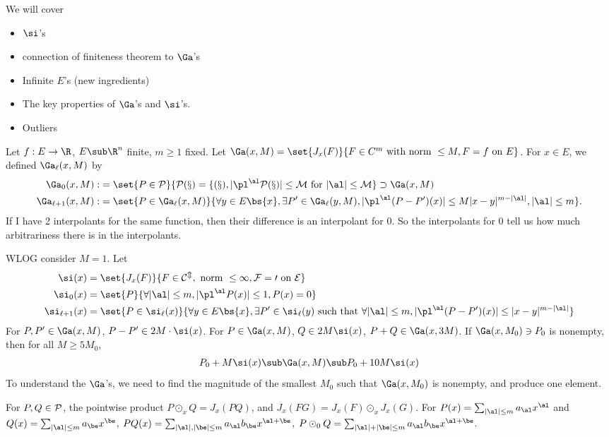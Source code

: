 
We will cover
\begin{itemize}
\item
$\si$'s
\item
connection of finiteness theorem to $\Ga$'s
\item
Infinite $E$'s (new ingredients)
\item
The key properties of $\Ga$'s and $\si$'s.
\item 
Outliers
\end{itemize}

Let $f:E\to \R$, $E\sub \R^n$ finite, $m\ge 1$ fixed. Let $\Ga(x,M) = \set{J_x(F)}{F\in C^m \text{ with norm }\le M, F=f\text{ on }E}$. For $x\in E$, we defined $\Ga_\ell (x,M)$ by 
\begin{align}
\Ga_0(x,M) :&= \set{P\in \cal P}{P(x)=f(x), |\pl^\al P(x)|\le M\text{ for }|\al|\le M}\supset \Ga(x,M)\\
\Ga_{\ell+1}(x,M) :&= 
\set{P\in \Ga_\ell(x,M)}{\forall y\in E\bs \{x\}, \exists P'\in \Ga_\ell(y,M), |\pl^\al(P-P')(x)|\le M|x-y|^{m-|\al|}, |\al|\le m}.
\end{align}
If I have 2 interpolants for the same function, then their difference is an interpolant for 0. So the interpolants for 0 tell us how much arbitrariness there is in the interpolants. 

WLOG consider $M=1$.
Let 
\begin{align}
\si(x) &= \set{J_x(F)}{F\in \cal C^m, \text{ norm }\le 1, F=0\text{ on }E}\\
\si_0(x) &=\set{P}{\forall |\al|\le m,|\pl^\al P(x)|\le 1, P(x)=0}\\
\si_{\ell+1}(x)&=\set{P\in \si_\ell(x)}{\forall y\in E\bs \{x\}, \exists P'\in \si_\ell(y)\text{ such that }\forall |\al|\le m, |\pl^\al(P-P')(x)|\le |x-y|^{m-|\al|}}
\end{align}
For $P,P'\in \Ga(x,M)$, $P-P'\in 2M \cdot \si(x)$. For $P\in \Ga(x,M)$, $Q\in 2M\si(x)$, $P+Q\in \Ga(x,3M)$. 
If $\Ga(x,M_0)\ni P_0$ is nonempty, then for all $M\ge 5M_0$, 
\begin{align}
P_0+M\si(x) \sub \Ga(x,M) \sub P_0+10M\si(x)
\end{align}
To understand the $\Ga$'s,  we need to find the magnitude of the smallest $M_0$ such that $\Ga(x,M_0)$ is nonempty, and produce one element. 

For $P,Q\in \cal P$, the pointwise product $P\odot_x Q= J_x(PQ)$, and $J_x(FG) = J_x(F)\odot_x J_x(G)$. For $P(x) = \sum_{|\al|\le m} a_\al x^\al$ and $Q(x) = \sum_{|\al|\le m} a_\be x^\be$, $PQ(x) = \sum_{|\al|,|\be|\le m} a_\al b_\be x^{\al+\be}$, $P\odot_0 Q = \sum_{|\al|+|\be|\le m} a_\al b_\be x^{\al+\be}$. 

